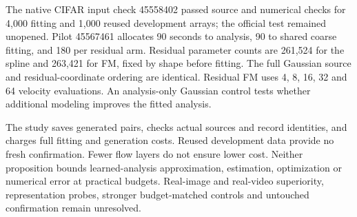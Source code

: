 \documentclass[11pt]{article}
\begin{document}
The native CIFAR input check 45558402 passed source and numerical checks for 4,000 fitting and 1,000 reused development arrays; the official test remained unopened. Pilot 45567461 allocates 90 seconds to analysis, 90 to shared coarse fitting, and 180 per residual arm. Residual parameter counts are 261,524 for the spline and 263,421 for FM, fixed by shape before fitting. The full Gaussian source and residual-coordinate ordering are identical. Residual FM uses 4, 8, 16, 32 and 64 velocity evaluations. An analysis-only Gaussian control tests whether additional modeling improves the fitted analysis.

The study saves generated pairs, checks actual sources and record identities, and charges full fitting and generation costs. Reused development data provide no fresh confirmation. Fewer flow layers do not ensure lower cost. Neither proposition bounds learned-analysis approximation, estimation, optimization or numerical error at practical budgets. Real-image and real-video superiority, representation probes, stronger budget-matched controls and untouched confirmation remain unresolved.
\end{document}
